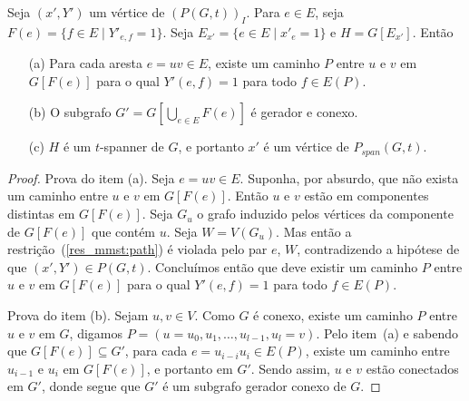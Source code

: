 \begin{proposicao}  %
\label{prop:correct_form}
Seja %
$(x',Y')$ um vértice de $(P(G,t))_{I}$.  %
Para $e \in E$, seja $F(e) = \{f \in E\; |\; Y'_{e,f} = 1\}$. 
Seja $E_{x'} = \{e \in E\; |\; x'_e = 1\}$ e $H = G[E_{x'}]$. 
Então

\begin{itemize} %
\item[{\rm (a)}] %
Para cada aresta $e = uv \in E$, existe um caminho $P$  entre $u$ e $v$ em 
$G[F(e)]$ para o qual $Y'(e,f) = 1$ para todo $f\in E(P)$. 


\item[{\rm (b)}]%
  O subgrafo $G' = G[\bigcup_{e \in E}F(e)]$ é gerador e conexo.


\item[{\rm (c)}] %
$H$ é um $t$-spanner de $G$, e portanto $x'$ é um vértice de $P_{span}(G,t)$.
\end{itemize}

\begin{proof}

  Prova do item (a).
  Seja $e = uv \in E$. Suponha,  por absurdo, que não exista um 
  caminho entre $u$ e $v$ em $G[F(e)]$. Então $u$ e $v$ estão 
  em componentes distintas em $G[F(e)]$. Seja $G_u$ o grafo induzido pelos 
  vértices da componente de $G[F(e)]$ que contém $u$. Seja $W = V(G_u)$. Mas 
  então a restrição~(\ref{res_mmst:path}) é violada pelo par $e$, $W$, 
  contradizendo a hipótese de que $(x',Y') \in P(G,t)$. Concluímos
  então que deve existir um caminho $P$ entre $u$ e $v$ em $G[F(e)]$
  para o qual  $Y'(e,f) = 1$ para todo $f\in E(P)$. 

\medskip

\noindent Prova do item (b).
%
Sejam $u,v \in V$. Como $G$ é conexo, existe um caminho $P$ entre $u$ e
$v$ em $G$, digamos 
\mbox{$P = (u = u_0, u_1,\ldots, u_{l-1}, u_l = v)$}. 
Pelo item~(a)  e sabendo que $G[F(e)] \subseteq G'$, 
para cada $e=u_{i-i}u_{i} \in E(P)$, existe um caminho entre $u_{i-1}$ e 
$u_{i}$ em $G[F(e)]$, e portanto em $G'$. 
Sendo assim, $u$ e $v$ estão conectados em $G'$, donde segue que $G'$ é um 
subgrafo gerador conexo de $G$.

\medskip


\end{proof}
\end{proposicao}

